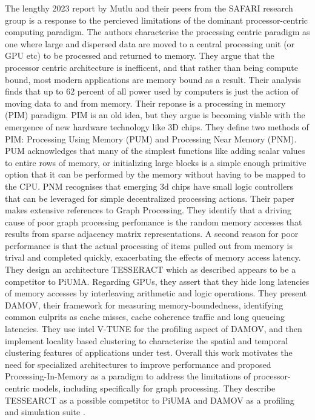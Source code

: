 \documentclass[sigconf,anonymous, authordraft]{acmart}
\begin{document}
\par{The lengthy 2023 report by Mutlu and their peers from the SAFARI research group is a response to the percieved limitations of the dominant processor-centric computing paradigm. 
The authors characterise the processing centric paradigm as one where large and dispersed data are moved to a central processing unit (or GPU etc) to be processed and returned to memory. 
They argue that the processor centric architecture is inefficent, and that rather than being compute bound, most modern applications are memory bound as a result. 
Their analysis finds that up to 62 percent of all power used by computers is just the action of moving data to and from memory. Their reponse is a processing in memory (PIM) paradigm. 
PIM is an old idea, but they argue is becoming viable with the emergence of new hardware technology like 3D chips. 
They define two methods of PIM: Processing Using Memory (PUM) and Processing Near Memory (PNM). 
PUM acknowledges that many of the simplest functions like adding scalar values to entire rows of memory, or initializing large blocks is a simple enough primitive option that it can be performed by the memory without having to be mapped to the CPU. 
PNM recognises that emerging 3d chips have small logic controllers that can be leveraged for simple decentralized processing actions. 
Their paper makes extensive references to Graph Processing. 
They identify that a driving cause of poor graph processing perfomance is the random memory accesses that results from sparse adjacency matrix representations. 
A second reason for poor performance is that the actual processing of items pulled out from memory is trival and completed quickly, exacerbating the effects of memory access latency. 
They design an architecture TESSERACT which as described appears to be a competitor to PiUMA. 
Regarding GPUs, they assert that they hide long latencies of memory accesses by interleaving arithmetic and logic operations. 
They present DAMOV, their framework for measuring memory-boundedness, identifying common culprits as cache misses, cache coherence traffic and long queueing latencies. 
They use intel V-TUNE for the profiling aspect of DAMOV, and then implement locality based clustering to characterize the spatial and temporal clustering features of applications under test. 
Overall this work motivates the need for specialized architectures to improve performance and proposed Processing-In-Memory as a paradigm to address the limitations of processor-centric models, including specifically for graph processing. 
They describe TESSEARCT as a possible competitor to PiUMA and DAMOV as a profiling and simulation suite \cite{Mutlu2023}.}
\end{document}

